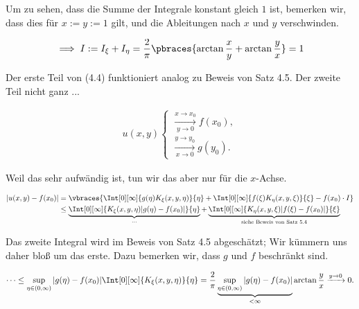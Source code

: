 \begin{solution}
  Um zu sehen, dass die Summe der Integrale konstant gleich $1$ ist, bemerken wir, dass dies für $x := y := 1$ gilt, und die Ableitungen nach $x$ und $y$ verschwinden.

  \begin{align*}
    \implies
    I
    :=
    I_\xi + I_\eta
    =
    \frac{2}{\pi}
    \pbraces
    {
      \arctan \frac{x}{y}
      +
      \arctan \frac{y}{x}
    }
    =
    1
  \end{align*}

  Der erste Teil von (4.4) funktioniert analog zu Beweis von Satz 4.5.
  Der zweite Teil nicht ganz ...

  \begin{align*}
    u(x, y)
    \begin{cases}
      \xrightarrow[y \to 0]{x \to x_0} f(x_0), \\
      \xrightarrow[x \to 0]{y \to y_0} g(y_0).
    \end{cases}
  \end{align*}

  Weil das sehr aufwändig ist, tun wir das aber nur für die $x$-Achse.

  \begin{align*}
    |u(x, y) - f(x_0)|
    & =
    \vbraces
    {
      \Int[0][\infty]
      {
        g(\eta)
        K_\xi(x, y, \eta)
      }{\eta}
      +
      \Int[0][\infty]
      {
        f(\xi)
        K_\eta(x, y, \xi)
      }{\xi}
      -
      f(x_0) \cdot I
    } \\
    & \leq
    \underbrace
    {
      \Int[0][\infty]
      {
        K_\xi(x, y, \eta)
        |g(\eta) - f(x_0)|
      }{\eta}
    }_{\cdots}
    +
    \underbrace
    {
      \Int[0][\infty]
      {
        K_\eta(x, y, \xi)
        |f(\xi) - f(x_0)|
      }{\xi}
    }_{
      \text{siehe Beweis von Satz 5.4}
    }
  \end{align*}

  Das zweite Integral wird im Beweis von Satz 4.5 abgeschätzt;
  Wir kümmern uns daher bloß um das erste.
  Dazu bemerken wir, dass $g$ und $f$ beschränkt sind.

  \begin{align*}
    \cdots \leq \sup_{\eta \in (0, \infty)}
      |g(\eta) - f(x_0)|
    \Int[0][\infty]
    {  K_\xi(x, y, \eta)}{\eta}
    = \frac{2}{\pi}\underbrace{\sup_{\eta \in (0, \infty)}
      |g(\eta) - f(x_0)|}_{< \infty}  \arctan \frac{y}{x}
      \xrightarrow{y \to 0} 0.
  \end{align*}
\end{solution}

